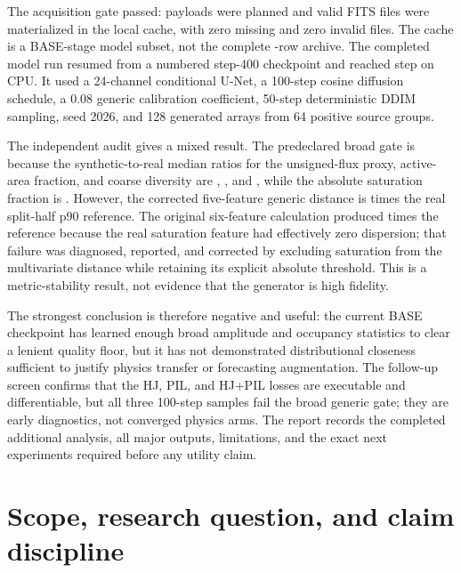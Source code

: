\documentclass[11pt,oneside]{report}
\begin{document}
The acquisition gate passed: \PlannedCount{} payloads were planned and \AcquiredCount{} valid FITS files were materialized in the local cache, with zero missing and zero invalid files. The cache is a BASE-stage model subset, not the complete \PrimaryCount{}-row archive. The completed model run resumed from a numbered step-400 checkpoint and reached step \BaseSteps{} on CPU. It used a 24-channel conditional U-Net, a 100-step cosine diffusion schedule, a 0.08 generic calibration coefficient, 50-step deterministic DDIM sampling, seed 2026, and 128 generated arrays from 64 positive source groups.

The independent audit gives a mixed result. The predeclared broad gate is \AuditGate{} because the synthetic-to-real median ratios for the unsigned-flux proxy, active-area fraction, and coarse diversity are \AuditFluxRatio{}, \AuditAreaRatio{}, and \AuditDiversityRatio{}, while the absolute saturation fraction is \AuditSatFraction{}. However, the corrected five-feature generic distance is \AuditDistanceRatio{} times the real split-half p90 reference. The original six-feature calculation produced \AuditOriginalDistanceRatio{} times the reference because the real saturation feature had effectively zero dispersion; that failure was diagnosed, reported, and corrected by excluding saturation from the multivariate distance while retaining its explicit absolute threshold. This is a metric-stability result, not evidence that the generator is high fidelity.

The strongest conclusion is therefore negative and useful: the current BASE checkpoint has learned enough broad amplitude and occupancy statistics to clear a lenient quality floor, but it has not demonstrated distributional closeness sufficient to justify physics transfer or forecasting augmentation. The follow-up screen confirms that the HJ, PIL, and HJ+PIL losses are executable and differentiable, but all three 100-step samples fail the broad generic gate; they are early diagnostics, not converged physics arms. The report records the completed additional analysis, all major outputs, limitations, and the exact next experiments required before any utility claim.

\tableofcontents
\listoffigures
\listoftables

\chapter{Scope, research question, and claim discipline}
\end{document}
